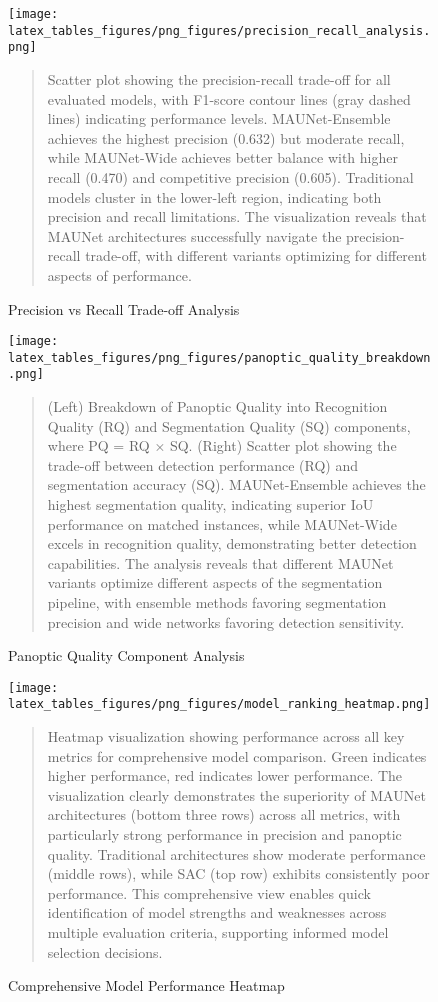 \begin{figure}[htbp]
\centering
\texttt{[image: latex\_tables\_figures/png\_figures/precision\_recall\_analysis.png]}
\caption{Precision vs Recall Trade-off Analysis}
\label{fig:precision_recall_png}
\begin{quote}
\small
Scatter plot showing the precision-recall trade-off for all evaluated models, with F1-score contour lines (gray dashed lines) indicating performance levels. MAUNet-Ensemble achieves the highest precision (0.632) but moderate recall, while MAUNet-Wide achieves better balance with higher recall (0.470) and competitive precision (0.605). Traditional models cluster in the lower-left region, indicating both precision and recall limitations. The visualization reveals that MAUNet architectures successfully navigate the precision-recall trade-off, with different variants optimizing for different aspects of performance.
\end{quote}
\end{figure}

\begin{figure}[htbp]
\centering
\texttt{[image: latex\_tables\_figures/png\_figures/panoptic\_quality\_breakdown.png]}
\caption{Panoptic Quality Component Analysis}
\label{fig:panoptic_quality_breakdown_png}
\begin{quote}
\small
(Left) Breakdown of Panoptic Quality into Recognition Quality (RQ) and Segmentation Quality (SQ) components, where PQ = RQ × SQ. (Right) Scatter plot showing the trade-off between detection performance (RQ) and segmentation accuracy (SQ). MAUNet-Ensemble achieves the highest segmentation quality, indicating superior IoU performance on matched instances, while MAUNet-Wide excels in recognition quality, demonstrating better detection capabilities. The analysis reveals that different MAUNet variants optimize different aspects of the segmentation pipeline, with ensemble methods favoring segmentation precision and wide networks favoring detection sensitivity.
\end{quote}
\end{figure}

\begin{figure}[htbp]
\centering
\texttt{[image: latex\_tables\_figures/png\_figures/model\_ranking\_heatmap.png]}
\caption{Comprehensive Model Performance Heatmap}
\label{fig:model_ranking_heatmap_png}
\begin{quote}
\small
Heatmap visualization showing performance across all key metrics for comprehensive model comparison. Green indicates higher performance, red indicates lower performance. The visualization clearly demonstrates the superiority of MAUNet architectures (bottom three rows) across all metrics, with particularly strong performance in precision and panoptic quality. Traditional architectures show moderate performance (middle rows), while SAC (top row) exhibits consistently poor performance. This comprehensive view enables quick identification of model strengths and weaknesses across multiple evaluation criteria, supporting informed model selection decisions.
\end{quote}
\end{figure}

